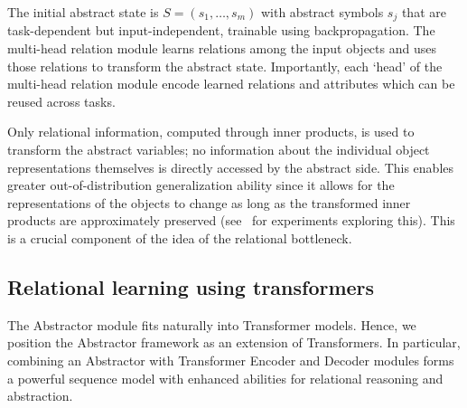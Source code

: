 
The initial abstract state is $S = (s_1,\ldots, s_m)$
with abstract symbols $s_j$ that are task-dependent but input-independent, trainable using
backpropagation. The multi-head relation module learns relations among the input objects and uses those
relations to transform the abstract state. Importantly, each `head' of the multi-head relation module
encode learned relations and attributes which can be reused across tasks.

Only relational information, computed through inner products,
is used to transform the abstract variables; no information about the individual object representations themselves is directly accessed by the abstract side. This enables greater out-of-distribution generalization ability since it allows for the representations of the objects to change as long as the transformed inner products are approximately preserved (see~ for experiments exploring this). This is a crucial component of the idea of the relational bottleneck.



\subsection{Relational learning using transformers}

The Abstractor module fits naturally into Transformer models. Hence, we position the Abstractor framework as an extension of Transformers. In particular, combining an Abstractor with Transformer Encoder and Decoder modules forms a powerful sequence model with enhanced abilities for relational reasoning and abstraction.

